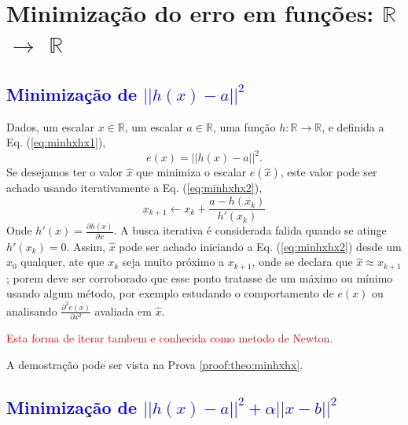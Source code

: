 
\chapter{Minimização do erro em funções: $\mathbb{R}$ $\rightarrow$ $\mathbb{R}$}

\section{\textcolor{blue}{Minimização de $||h(x)-a||^2$}} 

\begin{theorem}\label{theo:minhxhx}
Dados,
um escalar $x \in \mathbb{R}$, 
um escalar $a \in \mathbb{R}$,  
uma função $h:\mathbb{R} \rightarrow \mathbb{R}$, e 
definida a Eq. (\ref{eq:minhxhx1}),
\begin{equation}\label{eq:minhxhx1}
e(x)=||h(x)-a||^2.
\end{equation}
Se desejamos ter o valor $\hat{x}$ que minimiza o escalar $e(\hat{x})$,
este valor pode ser achado usando iterativamente a Eq. (\ref{eq:minhxhx2}),
\begin{equation}\label{eq:minhxhx2}
x_{k+1} \leftarrow x_k+
\frac{ a-h(x_k)}{h'(x_k)}
\end{equation}
Onde  $h'(x)=\frac{\partial h(x)}{\partial x}$. A busca iterativa é considerada 
falida quando se atinge $h'(x_k) = 0$.
Assim, $\hat{x}$ pode ser achado iniciando a Eq. (\ref{eq:minhxhx2}) desde um $x_{0}$ qualquer, ate que $x_{k}$ seja muito próximo a $x_{k+1}$,
onde se declara que $\hat{x} \approx x_{k+1}$; porem deve ser corroborado
que esse ponto tratasse de um máximo ou mínimo usando algum método, por exemplo estudando o comportamento 
de $e(x)$ ou analisando  $\frac{\partial^2 e(x)}{\partial x^2}$ avaliada em $\hat{x}$.

\textcolor{red}{Esta forma de iterar tambem e conhecida como metodo de Newton.}

\FALTAPROVA
A demostração pode ser vista na Prova \ref{proof:theo:minhxhx}.
\end{theorem}

\section{\textcolor{blue}{Minimização de $||h(x)-a||^2+\alpha ||x-b||^2$}}

